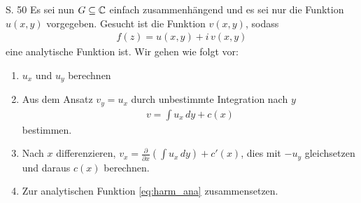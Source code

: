 \begin{bemerkung}{}{S. 50}
  Es sei nun $G \subseteq \mathbb{C}$ einfach zusammenhängend und es sei nur die Funktion $u(x,y)$ vorgegeben.
  Gesucht ist die Funktion $v(x,y)$, sodass
  \begin{align}
    f(z) = u(x,y) + i \, v(x,y) \label{eq:harm_ana}
  \end{align}
  eine analytische Funktion ist.
  Wir gehen wie folgt vor:
  \begin{enumerate}
    \item $u_x$ und $u_y$ berechnen
    \item Aus dem Ansatz $v_y = u_x$ durch unbestimmte Integration nach $y$
      \begin{align}
      v = \int u_x \, dy + c(x)
      \end{align}
      bestimmen.
    \item Nach $x$ differenzieren, $\displaystyle v_x = \frac{\partial}{\partial x} \left( \int u_x \, dy \right) + c'(x)$, dies mit $-u_y$ gleichsetzen und daraus $c(x)$ berechnen.
    \item Zur analytischen Funktion \eqref{eq:harm_ana} zusammensetzen.
  \end{enumerate}
\end{bemerkung}
